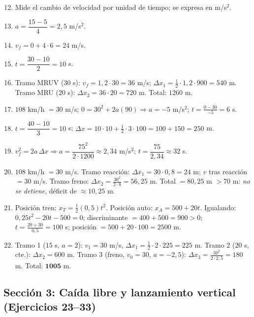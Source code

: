 \documentclass[12pt, letterpaper]{article}
\begin{document}
  \begin{enumerate}[leftmargin=*, label=\textbf{\arabic*.}]
    \setcounter{enumi}{11}
    \item Mide el cambio de velocidad por unidad de tiempo; se expresa en m/s$^2$.
    \item $a = \dfrac{15 - 5}{4} = 2{,}5$ m/s$^2$.
    \item $v_f = 0 + 4 \cdot 6 = 24$ m/s.
    \item $t = \dfrac{30 - 10}{2} = 10$ s.
    \item Tramo MRUV ($30$ s): $v_f = 1{,}2 \cdot 30 = 36$ m/s; $\Delta x_1 = \tfrac{1}{2} \cdot 1{,}2 \cdot 900 = 540$ m. Tramo MRU ($20$ s): $\Delta x_2 = 36 \cdot 20 = 720$ m. Total: $1260$ m.
    \item $108$ km/h $= 30$ m/s; $0 = 30^2 + 2a(90) \Rightarrow a = -5$ m/s$^2$; $t = \frac{0 - 30}{-5} = 6$ s.
    \item $t = \dfrac{40 - 10}{3} = 10$ s; $\Delta x = 10 \cdot 10 + \tfrac{1}{2} \cdot 3 \cdot 100 = 100 + 150 = 250$ m.
    \item $v_f^2 = 2a\,\Delta x \Rightarrow a = \dfrac{75^2}{2 \cdot 1200} \approx 2{,}34$ m/s$^2$; $t = \dfrac{75}{2{,}34} \approx 32$ s.
    \item $108$ km/h $= 30$ m/s. Tramo reacción: $\Delta x_1 = 30 \cdot 0{,}8 = 24$ m; $v$ tras reacción $= 30$ m/s. Tramo freno: $\Delta x_2 = \tfrac{30^2}{2 \cdot 8} = 56{,}25$ m. Total $= 80{,}25$ m $> 70$ m: \emph{no se detiene}, déficit de $\approx 10{,}25$ m.
    \item Posición tren: $x_T = \tfrac{1}{2}(0{,}5)t^2$. Posición auto: $x_A = 500 + 20t$. Igualando: $0{,}25t^2 - 20t - 500 = 0$; discriminante $= 400 + 500 = 900 > 0$; $t = \frac{20 + 30}{0{,}5} = 100$ s; posición $= 500 + 20 \cdot 100 = 2500$ m.
    \item Tramo 1 ($15$ s, $a=2$): $v_1=30$ m/s, $\Delta x_1 = \tfrac{1}{2}\cdot2\cdot225 = 225$ m. Tramo 2 ($20$ s, cte.): $\Delta x_2 = 600$ m. Tramo 3 (freno, $v_0=30$, $a=-2{,}5$): $\Delta x_3 = \frac{30^2}{2\cdot2{,}5}=180$ m. Total: $\mathbf{1005}$ m.
  \end{enumerate}

  \subsection*{Sección 3: Caída libre y lanzamiento vertical (Ejercicios 23--33)}
\end{document}
